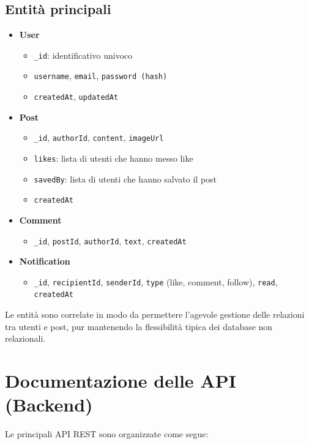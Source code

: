 \documentclass[a4paper,12pt]{article}
\begin{document}
\subsection{Entità principali}
\begin{itemize}
    \item \textbf{User}
    \begin{itemize}
        \item \texttt{\_id}: identificativo univoco
        \item \texttt{username}, \texttt{email}, \texttt{password (hash)}
        \item \texttt{createdAt}, \texttt{updatedAt}
    \end{itemize}

    \item \textbf{Post}
    \begin{itemize}
        \item \texttt{\_id}, \texttt{authorId}, \texttt{content}, \texttt{imageUrl}
        \item \texttt{likes}: lista di utenti che hanno messo like
        \item \texttt{savedBy}: lista di utenti che hanno salvato il post
        \item \texttt{createdAt}
    \end{itemize}

    \item \textbf{Comment}
    \begin{itemize}
        \item \texttt{\_id}, \texttt{postId}, \texttt{authorId}, \texttt{text}, \texttt{createdAt}
    \end{itemize}

    \item \textbf{Notification}
    \begin{itemize}
        \item \texttt{\_id}, \texttt{recipientId}, \texttt{senderId}, \texttt{type} (like, comment, follow), \texttt{read}, \texttt{createdAt}
    \end{itemize}
\end{itemize}

Le entità sono correlate in modo da permettere l’agevole gestione delle relazioni tra utenti e post, pur mantenendo la flessibilità tipica dei database non relazionali.

\section{Documentazione delle API (Backend)}
Le principali API REST sono organizzate come segue:
\end{document}
